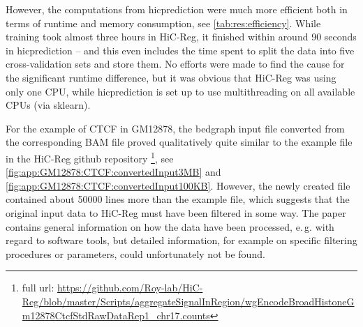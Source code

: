 However, the computations from hicprediction were much more efficient both in terms of runtime and memory consumption,
see \autoref{tab:res:efficiency}. While training took almost three hours in HiC-Reg, it finished within around 90 seconds
in hicprediction -- and this even includes the time spent to split the data into five cross-validation sets and store them.
No efforts were made to find the cause for the significant runtime difference, 
but it was obvious that HiC-Reg was using only one CPU, while hicprediction is set up to use multithreading on
all available CPUs (via sklearn).
\begin{table}[htb]
\caption{computational effort HiC-Reg vs. hicprediction} \label{tab:res:efficiency}
\end{table}

For the example of CTCF in GM12878, the bedgraph input file converted from the corresponding BAM file 
proved qualitatively quite similar to the example file in the HiC-Reg github repository 
\cite{Roy2020}\footnote{full url: 
\url{https://github.com/Roy-lab/HiC-Reg/blob/master/Scripts/aggregateSignalInRegion/wgEncodeBroadHistoneGm12878CtcfStdRawDataRep1_chr17.counts}},
see \autoref{fig:app:GM12878:CTCF:convertedInput3MB} and \ref{fig:app:GM12878:CTCF:convertedInput100KB}.
However, the newly created file contained about \num{50000} lines more than the example file, 
which suggests that the original input data to HiC-Reg must have been filtered in some way. 
The paper \cite{Zhang2019} contains general information on how the data have been processed,
e.\,g. with regard to software tools, but detailed information, for example on specific filtering procedures or parameters, 
could unfortunately not be found.

